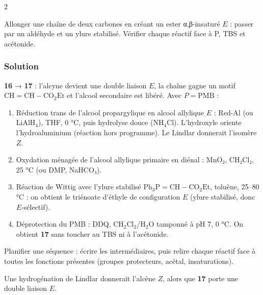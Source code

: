 \documentclass[11pt,a4paper]{article}
\providecommand{\tightlist}{\setlength{\itemsep}{0pt}\setlength{\parskip}{0pt}}
\begin{document}
\begin{indication}{2}

Allonger une chaîne de deux carbones en créant un ester α,β-insaturé \(E\) : passer par un aldéhyde et un ylure stabilisé. Vérifier chaque réactif face à P, TBS et acétonide.

\end{indication}

\hypertarget{solution-56}{%
\subsubsection{Solution}\label{solution-56}}

\textbf{16} → \textbf{17} : l'alcyne devient une double liaison \(E\), la chaîne gagne un motif \(\mathrm{CH{=}CH{-}CO_2Et}\) et l'alcool secondaire est libéré. Avec \(P=\mathrm{PMB}\) :

\begin{enumerate}
\def\labelenumi{\arabic{enumi}.}
\tightlist
\item
  Réduction trans de l'alcool propargylique en alcool allylique \(E\) : Red-Al (ou LiAlH\(_4\)), THF, 0 °C, puis hydrolyse douce (NH\(_4\)Cl). L'hydroxyle oriente l'hydroaluminium (réaction hors programme). Le Lindlar donnerait l'isomère \(Z\).
\item
  Oxydation ménagée de l'alcool allylique primaire en diénal : MnO₂, CH₂Cl₂, 25 °C (ou DMP, NaHCO₃).
\item
  Réaction de Wittig avec l'ylure stabilisé \(\mathrm{Ph_3P{=}CH{-}CO_2Et}\), toluène, 25--80 °C : on obtient le triénoate d'éthyle de configuration \(E\) (ylure stabilisé, donc \(E\)-sélectif).
\item
  Déprotection du PMB : DDQ, CH\(_2\)Cl\(_2\)/H\(_2\)O tamponné à pH 7, 0 °C. On obtient \textbf{17} sans toucher au TBS ni à l'acétonide.
\end{enumerate}

\begin{methode}

Planifier une séquence : écrire les intermédiaires, puis relire chaque réactif face à toutes les fonctions présentes (groupes protecteurs, acétal, insaturations).

\end{methode}

\begin{piege}

Une hydrogénation de Lindlar donnerait l'alcène \(Z\), alors que \textbf{17} porte une double liaison \(E\).

\end{piege}
\end{document}
